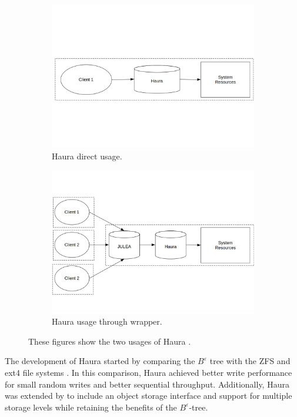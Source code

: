 \documentclass[
	12pt,
	a4paper,
	abstract,
	bibliography=totoc,
	chapterprefix,
	headings=openright,
	numbers=endperiod,
	parskip=half,
	twoside,
]{scrreprt}
\begin{document}
\begin{figure}[H]
	\centering
	\begin{subfigure}{0.4\textwidth}
		\includegraphics[width=\textwidth]{haura_directly.jpg}		
		\caption{Haura direct usage.}
		\label{fig:randread zipf}
	\end{subfigure}
	\hfill
	\begin{subfigure}{0.4\textwidth}
		\includegraphics[width=\textwidth]{haura_wrapper.jpg}		
		\caption{Haura usage through wrapper.}
		\label{fig:randread normal}
	\end{subfigure}
	
	\caption{These figures show the two usages of Haura \cite{hauraDocu}.}
	\label{fig:haura usage}
\end{figure}

The development of Haura started by comparing the $B^{\varepsilon}$ tree with the ZFS 
and ext4 file systems \cite{wiedemann2018modern}.
In this comparison, Haura achieved better write performance for small random writes and better sequential throughput.
Additionally, Haura was extended by \cite{hoppner2021design} to include an object storage interface and 
support for multiple storage levels while retaining the benefits of the $B^{\varepsilon}$-tree.
\end{document}
